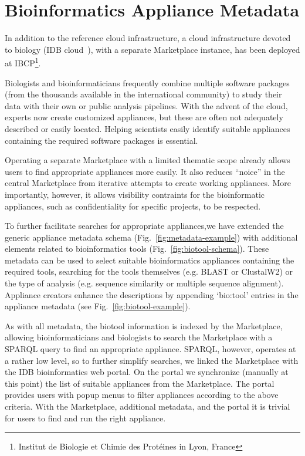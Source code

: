\section{Bioinformatics Appliance Metadata}
\label{sec:bioinfo}

In addition to the reference cloud infrastructure, a cloud
infrastructure devoted to biology (IDB cloud~\cite{idbcloud}), with a
separate Marketplace instance, has been deployed at
IBCP\footnote{Institut de Biologie et Chimie des Prot\'eines in Lyon,
  France}.

Biologists and bioinformaticians frequently combine multiple software
packages (from the thousands available in the international community)
to study their data with their own or public analysis pipelines. With
the advent of the cloud, experts now create customized appliances, but
these are often not adequately described or easily located.  Helping
scientists easily identify suitable appliances containing the required
software packages is essential.

Operating a separate Marketplace with a limited thematic scope already
allows users to find appropriate appliances more easily.  It also
reduces ``noice'' in the central Marketplace from iterative attempts
to create working appliances.  More importantly, however, it allows
visibility contraints for the bioinformatic appliances, such as
confidentiality for specific projects, to be respected.

To further facilitate searches for appropriate appliances,we have
extended the generic appliance metadata schema
(Fig.~\ref{fig:metadata-example}) with additional elements related to
bioinformatics tools (Fig.~\ref{fig:biotool-schema})\@. These metadata
can be used to select suitable bioinformatics appliances containing
the required tools, searching for the tools themselves (e.g. BLAST or
ClustalW2) or the type of analysis (e.g. sequence similarity or
multiple sequence alignment).  Appliance creators enhance the
descriptions by appending `bio:tool' entries in the appliance metadata
(see Fig.~\ref{fig:biotool-example}).

As with all metadata, the biotool information is indexed by the
Marketplace, allowing bioinformaticians and biologists to search the
Marketplace with a SPARQL query to find an appropriate appliance.
SPARQL, however, operates at a rather low level, so to further
simplify searches, we linked the Marketplace with the IDB
bioinformatics web portal. On the portal we synchronize (manually at
this point) the list of suitable appliances from the Marketplace. The
portal provides users with popup menus to filter appliances according
to the above criteria.  With the Marketplace, additional metadata, and
the portal it is trivial for users to find and run the right
appliance.

